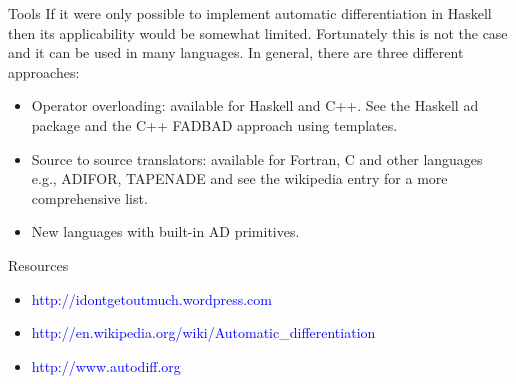 \documentclass{beamer}
\begin{document}
\begin{frame}[fragile]{Tools}
  If it were only possible to implement automatic differentiation in
  Haskell then its applicability would be somewhat
  limited. Fortunately this is not the case and it can be used in many
  languages. In general, there are three different approaches:

\begin{itemize}
\item Operator overloading: available for Haskell and C++. See the
  Haskell ad package and the C++ FADBAD approach using templates.
\item Source to source translators: available for Fortran, C and other
  languages e.g., ADIFOR, TAPENADE and see the wikipedia entry for a
  more comprehensive list.
\item New languages with built-in AD primitives.
\end{itemize}
\end{frame}

\begin{frame}[fragile]{Resources}
\begin{itemize}
\item \textcolor{blue}{http://idontgetoutmuch.wordpress.com}
\item
  \textcolor{blue}{http://en.wikipedia.org/wiki/Automatic\_differentiation}
\item \textcolor{blue}{http://www.autodiff.org}
\end{itemize}
\end{frame}
\end{document}
